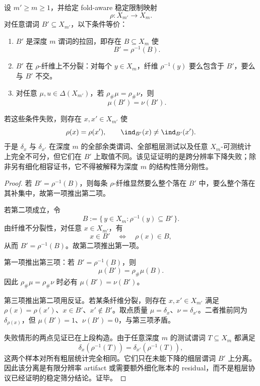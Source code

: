 \begin{theorem}[跨分辨率谓词的下降判别与分裂纤维见证]\label{distill:cech_cohomology-refinement_stability_separation-stat-cross-resolution-predicate-descent}
设 \(m'\ge m\ge1\)，并给定 fold-aware 稳定限制映射
\[
\rho:X_{m'}\longrightarrow X_m.
\]
对任意谓词 \(B'\subseteq X_{m'}\)，以下条件等价：
\begin{enumerate}
  \item \(B'\) 是深度 \(m\) 谓词的拉回，即存在 \(B\subseteq X_m\) 使
  \[
  B'=\rho^{-1}(B).
  \]
  \item \(B'\) 在 \(\rho\)-纤维上不分裂：对每个 \(y\in X_m\)，纤维 \(\rho^{-1}(y)\) 要么包含于 \(B'\)，要么与 \(B'\) 不交。
  \item 对任意 \(\mu,
u\in\Delta(X_{m'})\)，若 \(\rho_\#\mu=\rho_\#\nu\)，则
  \[
  \mu(B')=\nu(B').
  \]
\end{enumerate}
若这些条件失败，则存在 \(x,x'\in X_{m'}\) 使
\[
\rho(x)=\rho(x'),\qquad \ind_{B'}(x)\ne\ind_{B'}(x').
\]
于是 \(\delta_x\) 与 \(\delta_{x'}\) 在深度 \(m\) 的全部余类谓词、全部粗层测试以及任意 \(X_m\)-可测统计上完全不可分，但它们在 \(B'\) 上取值不同。该见证证明的是跨分辨率下降失败；除非另有细化相容证书，它不得被解释为深度 \(m\) 的结构性筛分刚性。
\end{theorem}
\begin{proof}
若 \(B'=\rho^{-1}(B)\)，则每条 \(\rho\)-纤维显然要么整个落在 \(B'\) 中，要么整个落在其补集中，故第一项推出第二项。

若第二项成立，令
\[
B:=\{\,y\in X_m:\rho^{-1}(y)\subseteq B'\,\}.
\]
由纤维不分裂性，对任意 \(x\in X_{m'}\)，有
\[
x\in B'\quad\Longleftrightarrow\quad \rho(x)
\in B,
\]
从而 \(B'=\rho^{-1}(B)\)。故第二项推出第一项。

第一项推出第三项：若 \(B'=\rho^{-1}(B)\)，则
\[
\mu(B')=\rho_\#\mu(B).
\]
因此 \(\rho_\#\mu=\rho_\#\nu\) 时必有 \(\mu(B')=\nu(B')\)。

第三项推出第二项用反证。若某条纤维分裂，则存在 \(x,x'\in X_{m'}\) 满足
\(\rho(x)=\rho(x')\)、\(x\in B'\)、\(x'\notin B'\)。取点质量
\(\mu=\delta_x\)、\(\nu=\delta_{x'}\)。二者推前同为 \(\delta_{\rho(x)}\)，但
\(\mu(B')=1\)、\(\nu(B')=0\)，与第三项矛盾。

失败情形的两点见证已在上段构造。由于任意深度 \(m\) 的测试谓词 \(T\subseteq X_m\) 都满足
\[
\delta_x(\rho^{-1}(T))=\delta_{x'}(\rho^{-1}(T)),
\]
这两个样本对所有粗层统计完全相同。它们只在未能下降的细层谓词 \(B'\) 上分离。因此该分离是有限分辨率 artifact 或需要额外细化账本的 residual，而不是粗层协议已经证明的稳定筛分结论。证毕。
\end{proof}

